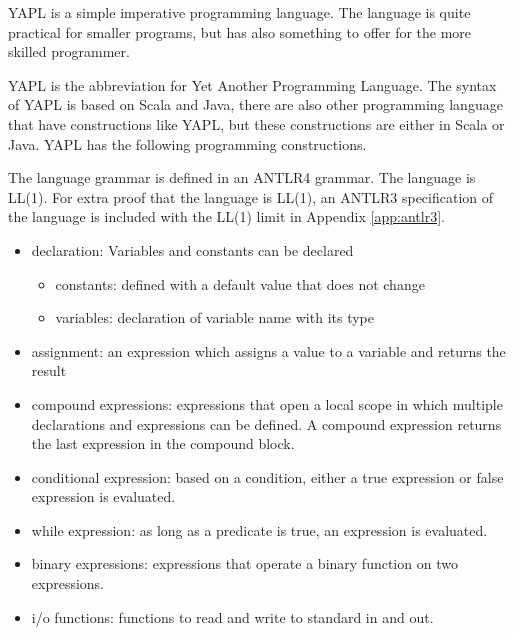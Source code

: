 YAPL is a simple imperative programming language. The language is quite practical for smaller programs, but has also something to offer for the more skilled programmer.


YAPL is the abbreviation for Yet Another Programming Language.
The syntax of YAPL is based on Scala and Java, there are also other programming language that have constructions like YAPL, but these constructions are either in Scala or Java.
YAPL has the following programming constructions.

The language grammar is defined in an ANTLR4 grammar. The language is LL(1). For extra proof that the language is LL(1), an ANTLR3 specification of the language is included with the LL(1) limit in Appendix \ref{app:antlr3}. 



\begin{itemize}
\item declaration: Variables and constants can be declared
\begin{itemize}
\item constants: defined with a default value that does not change
\item variables: declaration of variable name with its type
\end{itemize}
\item assignment: an expression which assigns a value to a variable and returns the result
\item compound expressions: expressions that open a local scope in which multiple declarations and expressions can be defined. A compound expression returns the last expression in the compound block.
\item conditional expression: based on a condition, either a true expression or false expression is evaluated.
\item while expression: as long as a predicate is true, an expression is evaluated.
\item binary expressions: expressions that operate a binary function on two expressions.
\item i/o functions: functions to read and write to standard in and out.
\end{itemize}